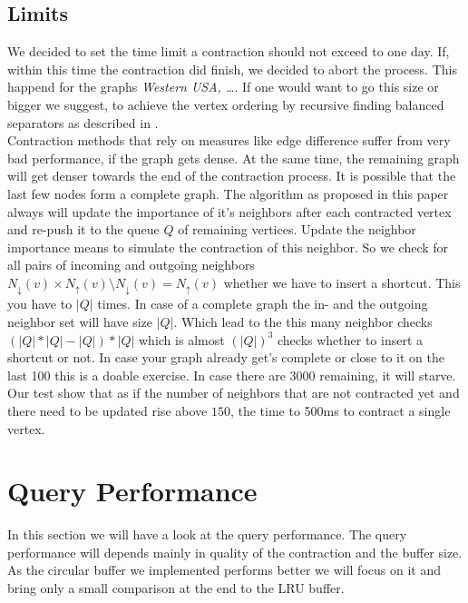 \subsection{Limits}

We decided to set the time limit a contraction should not exceed to one day. If, within this time the contraction did finish, we decided to abort the process. This happend for the graphs \textit{Western USA, …}. If one would want to go this size or bigger we suggest,
to achieve the vertex ordering by recursive finding balanced separators as described in \cite[Customization Contraction Hierarchies]{CCH}. 
\\
Contraction methods that rely on measures like edge difference suffer from very bad performance, if the graph gets dense. At the same time, the remaining graph will get denser towards the end of the contraction process. It is possible  that the last few nodes form a complete graph. The algorithm
as proposed in this paper always will update the importance  of it's neighbors  after each contracted vertex and re-push it to the queue $Q$ of remaining vertices. Update the neighbor importance means to simulate the contraction of this neighbor. So we check for all pairs of incoming and outgoing neighbors $N_\downarrow(v) \times N_\uparrow(v) \setminus N_\downarrow(v) = N_\uparrow(v)$ whether we have to insert a shortcut. 
This you have to $|Q|$ times. In case of a complete graph the in- and the outgoing neighbor set will have size $|Q|$. Which lead to the this many neighbor checks $(|Q| * |Q| - |Q|)*|Q|$ which is almost $(|Q|)^3$ checks whether to insert a shortcut or not. In case your graph already get's complete or close to it on the last 
100 this is a doable exercise. In case there are 3000 remaining, it will starve. 
\\
Our test show that as if the number of neighbors that are not contracted yet and there need to be updated rise above $150$, the time to 500ms to contract a single vertex.




\section{Query Performance}

In this section we will have a look at the query performance. The query performance will depends mainly in quality of the contraction and the buffer size. 
As the circular buffer we implemented performs better we will focus on it and bring only a small comparison at the end to the LRU buffer.


